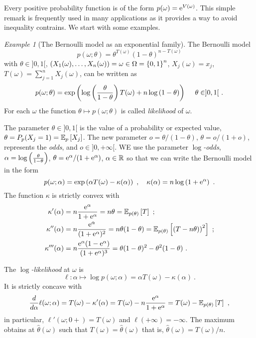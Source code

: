 \documentclass[12pt,a4paper]{amsart}
\theoremstyle{plain}%
\theoremstyle{definition}
\theoremstyle{remark}
\newtheorem{example}{Example}
\begin{document}
Every positive probability function is of the form $p(\omega) = \mathrm{e}^{V(\omega)}$. This simple remark is frequently used in many applications as it provides a way to avoid inequality contrains. We start with some examples.

\begin{example}[The Bernoulli model as an exponential family]
  The Bernoulli model
  \begin{equation*}
 p(\omega;\theta) = \theta^{T(\omega)} (1-\theta)^{n-T(\omega)}
\end{equation*}
with $\theta \in ]0,1[$, $(X_1(\omega),\dots,X_n(\omega)) = \omega \in \Omega = \left\{0,1\right\}^n$, $X_j(\omega) = x_j$, $T(\omega) = \sum_{j=1}^n X_j(\omega)$, can be written as
    \begin{equation*}
      p(\omega;\theta) = \expof{\logof{\frac{\theta}{1-\theta}}T(\omega) + n\logof{1-\theta}} \ \quad \theta \in ]0,1[ \ .
    \end{equation*}
    For each $\omega$ the function $\theta \mapsto p(\omega;\theta)$ is called \emph{likelihood} of $\omega$.

The parameter $\theta \in ]0,1[$ is the value of a probability or expected value, $\theta = P_p(X_j=1) = \operatorname{\mathbb E}_{p}\left[X_j\right]$. The new parameter $o = \theta/(1-\theta)$, $\theta = o/(1+o)$, represents the \emph{odds}, and $o \in ]0,+\infty[$. WE use the parameter \emph{$\log$-odds}, $\alpha = \log\left(\frac{\theta}{1-\theta}\right)$, $\theta = \mathrm{e}^\alpha/(1+\mathrm{e}^\alpha)$, $\alpha \in \mathbb{R}$ so that we can write the Bernoulli model in the form
  \begin{equation*}
    p(\omega;\alpha) = \expof{\alpha T(\omega) - \kappa(\alpha)} \ , \quad \kappa(\alpha) = n \logof{1+\euler^\alpha} \ .
  \end{equation*}
The function $\kappa$ is strictly convex with
\begin{align*}
  \kappa'(\alpha) &= n\frac{\euler^\alpha}{1+\euler^\alpha} = n\theta = \expectat {p(\theta)} T \ ;\\
  \kappa''(\alpha) &= n\frac{\euler^\alpha}{(1+\euler^\alpha)^2} = n\theta(1-\theta) = \expectat {p(\theta)} {\left(T-n\theta)\right)^2} \ ; \\
  \kappa'''(\alpha) &= n \frac{\euler^\alpha(1-\euler^\alpha)}{(1+\euler^\alpha)^3} = \theta(1-\theta)^2 - \theta^2(1-\theta) \ .
\end{align*}

The \emph{$\log$-likelihood} at $\omega$ is
\begin{equation*}
 \ell \colon \alpha \mapsto \log p(\omega;\alpha) = \alpha T(\omega) - \kappa(\alpha) \ .
\end{equation*}
It is strictly concave with
\begin{equation*}
  \frac{d}{d\alpha} \ell(\omega;\alpha) = T(\omega) - \kappa'(\alpha) = T(\omega) -  n \frac{\mathrm{e}^\alpha}{1+\mathrm{e}^\alpha} = T(\omega) - \operatorname{\mathbb E}_{p(\theta)}\left[T\right] \ ,
\end{equation*}
in particular, $\ell'(\omega;0+) = T(\omega)$ and $\ell(+\infty) = -\infty$. The maximum obtains at $\hat\theta(\omega)$ such that $T(\omega) = \hat\theta(\omega)$ that is, $\hat \theta(\omega) = T(\omega)/n$.


\end{example}
\end{document}
